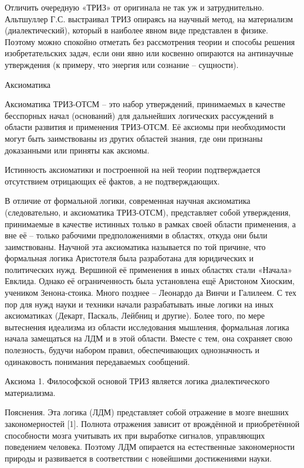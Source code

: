 \documentclass[11pt,a4paper]{article}
\begin{document}
Отличить очередную «ТРИЗ» от оригинала не так уж и затруднительно. Альтшуллер Г.С. выстраивал ТРИЗ опираясь на научный метод, на материализм (диалектический), который в наиболее явном виде представлен в физике. Поэтому можно спокойно отметать без рассмотрения теории и способы решения изобретательских задач, если они явно или косвенно опираются на антинаучные утверждения (к примеру, что энергия или сознание – сущности).

 

 

Аксиоматика

 

Аксиоматика ТРИЗ-ОТСМ – это набор утверждений, принимаемых в качестве бесспорных начал (оснований) для дальнейших логических рассуждений в области развития и применения ТРИЗ-ОТСМ. Её аксиомы при необходимости могут быть заимствованы из других областей знания, где они признаны доказанными или приняты как аксиомы.

Истинность аксиоматики и построенной на ней теории подтверждается отсутствием отрицающих её фактов, а не подтверждающих.

В отличие от формальной логики, современная научная аксиоматика (следовательно, и аксиоматика ТРИЗ-ОТСМ), представляет собой утверждения, принимаемые в качестве истинных только в рамках своей области применения, а вне её – только рабочими предположениями в областях, откуда они были заимствованы. Научной эта аксиоматика называется по той причине, что формальная логика Аристотеля была разработана для юридических и политических нужд. Вершиной её применения в иных областях стали «Начала» Евклида. Однако её ограниченность была установлена ещё Аристоном Хиоским, учеником Зенона-стоика. Много позднее – Леонардо да Винчи и Галилеем. С тех пор для нужд науки и техники начали разрабатывать иные логики на иных аксиоматиках (Декарт, Паскаль, Лейбниц и другие). Более того, по мере вытеснения идеализма из области исследования мышления, формальная логика начала замещаться на ЛДМ и в этой области. Вместе с тем, она сохраняет свою полезность, будучи набором правил, обеспечивающих однозначность и одинаковость понимания передаваемых сообщений.

 

Аксиома 1. Философской основой ТРИЗ является логика диалектического материализма.

Пояснения. Эта логика (ЛДМ) представляет собой отражение в мозге внешних закономерностей [1]. Полнота отражения зависит от врождённой и приобретённой способности мозга учитывать их при выработке сигналов, управляющих поведением человека. Поэтому ЛДМ опирается на естественные закономерности природы и развивается в соответствии с новейшими достижениями науки.
\end{document}
